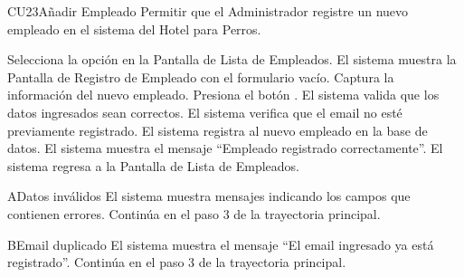 
\begin{UseCase}{CU23}{Añadir Empleado}{
	Permitir que el Administrador registre un nuevo empleado en el sistema del Hotel para Perros.
}
\end{UseCase}

\begin{UCtrayectoria}
	\UCpaso[\UCactor] Selecciona la opción  en la Pantalla de Lista de Empleados.
	\UCpaso El sistema muestra la Pantalla de Registro de Empleado con el formulario vacío.
	\UCpaso[\UCactor] Captura la información del nuevo empleado.
	\UCpaso[\UCactor] Presiona el botón .
	\UCpaso El sistema valida que los datos ingresados sean correctos.
	\UCpaso El sistema verifica que el email no esté previamente registrado.
	\UCpaso El sistema registra al nuevo empleado en la base de datos.
	\UCpaso El sistema muestra el mensaje ``Empleado registrado correctamente''.
	\UCpaso El sistema regresa a la Pantalla de Lista de Empleados.
\end{UCtrayectoria}

\begin{UCtrayectoriaA}{A}{Datos inválidos}
	\UCpaso El sistema muestra mensajes indicando los campos que contienen errores.
	\UCpaso Continúa en el paso 3 de la trayectoria principal.
\end{UCtrayectoriaA}

\begin{UCtrayectoriaA}{B}{Email duplicado}
	\UCpaso El sistema muestra el mensaje ``El email ingresado ya está registrado''.
	\UCpaso Continúa en el paso 3 de la trayectoria principal.
\end{UCtrayectoriaA}

